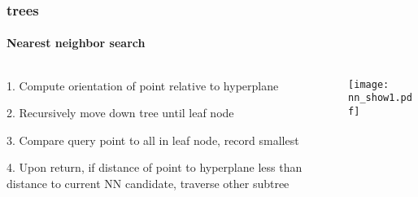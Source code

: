 
\begin{frame}
  \frametitle{\kd trees}
  \framesubtitle{Nearest neighbor search}
  \begin{columns}[T]
    \begin{column}{.5\textwidth}
      \begin{block}{}%
        {\color{white} 1.\hspace{1mm} Compute orientation of point relative to hyperplane
          \\\vspace{0.4cm}
        
        2.\hspace{1mm} Recursively move down tree until leaf node\\\vspace{0.4cm}

        3.\hspace{1mm} Compare query point to all in leaf node, record smallest\\\vspace{0.4cm}
    
        4.\hspace{1mm} Upon return, if distance of point to hyperplane less than distance to current
          NN candidate, traverse other subtree}
      \end{block}
    \end{column}
    \begin{column}{.5\textwidth}
      \begin{block}{}
        \texttt{[image: nn\_show1.pdf]}
      \end{block}
    \end{column}
  \end{columns}
\end{frame}

